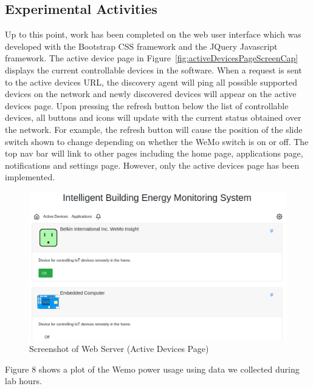 \documentclass[letterpaper,12pt]{article}   %
\begin{document}
\subsection{Experimental Activities} \label{sec:expresults}
Up to this point, work has been completed on the web user interface which was developed with the Bootstrap CSS framework and the JQuery Javascript framework. The active device page in Figure~\ref{fig:activeDevicesPageScreenCap} displays the current controllable devices in the software. When a request is sent to the active devices URL, the discovery agent will ping all possible supported devices on the network and newly discovered devices will appear on the active devices page. Upon pressing the refresh button below the list of controllable devices, all buttons and icons will update with the current status obtained over the network. For example, the refresh button will cause the position of the slide switch shown to change depending on whether the WeMo switch is on or off. The top nav bar will link to other pages including the home page, applications page, notifications and settings page. However, only the active devices page has been implemented.

\begin{figure}
    \centering
    \includegraphics[scale=0.4]{figs/activeDevicesWithEmbeddedPicture.png}
    \caption{Screenshot of Web Server (Active Devices Page)}
    \label{fig:my_label}
\end{figure}

Figure 8 shows a plot of the Wemo power usage using data we collected during lab hours.
\end{document}
